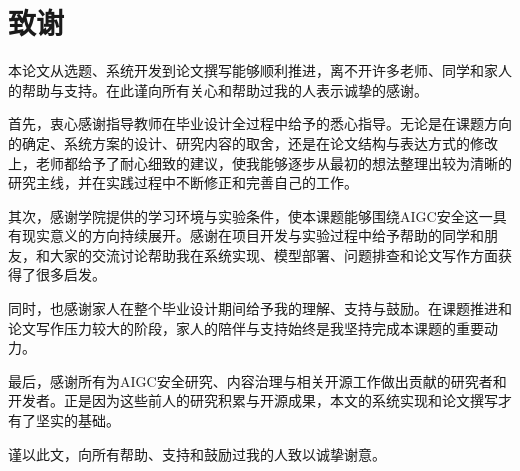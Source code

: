 \chapter*{致\qquad 谢}
{}

本论文从选题、系统开发到论文撰写能够顺利推进，离不开许多老师、同学和家人的帮助与支持。在此谨向所有关心和帮助过我的人表示诚挚的感谢。

首先，衷心感谢指导教师在毕业设计全过程中给予的悉心指导。无论是在课题方向的确定、系统方案的设计、研究内容的取舍，还是在论文结构与表达方式的修改上，老师都给予了耐心细致的建议，使我能够逐步从最初的想法整理出较为清晰的研究主线，并在实践过程中不断修正和完善自己的工作。

其次，感谢学院提供的学习环境与实验条件，使本课题能够围绕AIGC安全这一具有现实意义的方向持续展开。感谢在项目开发与实验过程中给予帮助的同学和朋友，和大家的交流讨论帮助我在系统实现、模型部署、问题排查和论文写作方面获得了很多启发。

同时，也感谢家人在整个毕业设计期间给予我的理解、支持与鼓励。在课题推进和论文写作压力较大的阶段，家人的陪伴与支持始终是我坚持完成本课题的重要动力。

最后，感谢所有为AIGC安全研究、内容治理与相关开源工作做出贡献的研究者和开发者。正是因为这些前人的研究积累与开源成果，本文的系统实现和论文撰写才有了坚实的基础。

谨以此文，向所有帮助、支持和鼓励过我的人致以诚挚谢意。
